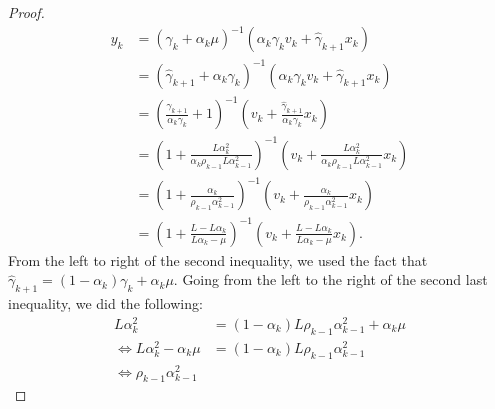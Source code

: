 \documentclass[12pt]{article}
\begin{document}
        \begin{proof}
            \begin{align*}
                y_{k} &= 
                (\gamma_k + \alpha_k \mu)^{-1}
                (\alpha_k \gamma_k v_k + \hat \gamma_{k + 1}x_k)
                \\
                &= 
                (\hat \gamma_{k + 1} + \alpha_k \gamma_k)^{-1}
                (\alpha_k \gamma_k v_k + \hat \gamma_{k + 1}x_k)
                \\
                &= 
                \left(
                    \frac{\hat \gamma_{k + 1}}{\alpha_k\gamma_k} + 1
                \right)^{-1}
                \left(
                    v_k + \frac{\hat \gamma_{k + 1}}{\alpha_k \gamma_k} x_k
                \right)
                \\
                &= 
                \left(
                    1 + \frac{L\alpha_k^2}{\alpha_k \rho_{k - 1}L\alpha_{k - 1}^2} 
                \right)^{-1}
                \left(
                    v_k + \frac{L\alpha_k^2}{\alpha_k \rho_{k - 1}L\alpha_{k - 1}^2} x_k
                \right)
                \\
                &= 
                \left(
                    1 + \frac{\alpha_k}{\rho_{k - 1}\alpha_{k - 1}^2}
                \right)^{-1}
                \left(
                    v_k + 
                    \frac{\alpha_k}{\rho_{k - 1}\alpha_{k - 1}^2} x_k
                \right)
                \\
                &= 
                \left(
                    1 + \frac{L - L \alpha_k}{L \alpha_k - \mu}
                \right)^{-1}
                \left(
                    v_k + 
                    \frac{L - L \alpha_k}{L \alpha_k - \mu} x_k
                \right). 
            \end{align*}
            From the left to right of the second inequality, we used the fact that $\hat \gamma_{k + 1} = (1 - \alpha_k)\gamma_k + \alpha_k\mu$. 
            Going from the left to the right of the second last inequality, we did the following: 
            \begin{align*}
                L\alpha_k^2 &= 
                (1 - \alpha_k)L\rho_{k- 1}\alpha_{k - 1}^2 + \alpha_k \mu 
                \\
                \iff 
                L \alpha_k^2 - \alpha_k\mu &= 
                (1 - \alpha_k)L \rho_{k - 1}\alpha_{k - 1}^2
                \\
                \iff 
                \rho_{k - 1}\alpha_{k - 1}^2

\end{align*}
\end{proof}
\end{document}
